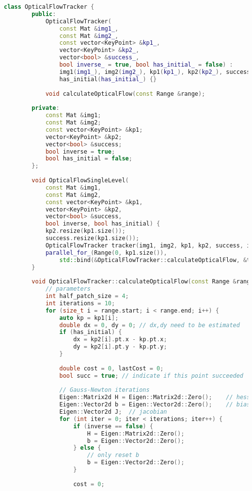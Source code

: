 \begin{lstlisting}[language=c++,caption=slambook2/ch8/optical_flow.cpp(fragment)]
	class OpticalFlowTracker {
		public:
			OpticalFlowTracker(
				const Mat &img1_,
				const Mat &img2_,
				const vector<KeyPoint> &kp1_,
				vector<KeyPoint> &kp2_,
				vector<bool> &success_,
				bool inverse_ = true, bool has_initial_ = false) :
				img1(img1_), img2(img2_), kp1(kp1_), kp2(kp2_), success(success_), inverse(inverse_),
				has_initial(has_initial_) {}
			
			void calculateOpticalFlow(const Range &range);
		
		private:
			const Mat &img1;
			const Mat &img2;
			const vector<KeyPoint> &kp1;
			vector<KeyPoint> &kp2;
			vector<bool> &success;
			bool inverse = true;
			bool has_initial = false;
		};
		
		void OpticalFlowSingleLevel(
			const Mat &img1,
			const Mat &img2,
			const vector<KeyPoint> &kp1,
			vector<KeyPoint> &kp2,
			vector<bool> &success,
			bool inverse, bool has_initial) {
			kp2.resize(kp1.size());
			success.resize(kp1.size());
			OpticalFlowTracker tracker(img1, img2, kp1, kp2, success, inverse, has_initial);
			parallel_for_(Range(0, kp1.size()),
				std::bind(&OpticalFlowTracker::calculateOpticalFlow, &tracker, placeholders::_1));
		}
		
		void OpticalFlowTracker::calculateOpticalFlow(const Range &range) {
			// parameters
			int half_patch_size = 4;
			int iterations = 10;
			for (size_t i = range.start; i < range.end; i++) {
				auto kp = kp1[i];
				double dx = 0, dy = 0; // dx,dy need to be estimated
				if (has_initial) {
					dx = kp2[i].pt.x - kp.pt.x;
					dy = kp2[i].pt.y - kp.pt.y;
				}
				
				double cost = 0, lastCost = 0;
				bool succ = true; // indicate if this point succeeded
				
				// Gauss-Newton iterations
				Eigen::Matrix2d H = Eigen::Matrix2d::Zero();    // hessian
				Eigen::Vector2d b = Eigen::Vector2d::Zero();    // bias
				Eigen::Vector2d J;  // jacobian
				for (int iter = 0; iter < iterations; iter++) {
					if (inverse == false) {
						H = Eigen::Matrix2d::Zero();
						b = Eigen::Vector2d::Zero();
					} else {
						// only reset b
						b = Eigen::Vector2d::Zero();
					}
					
					cost = 0;
					

\end{lstlisting}
